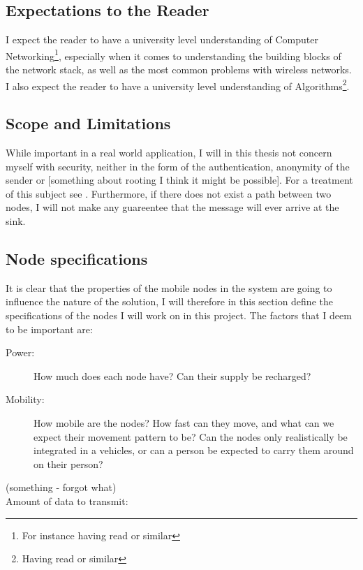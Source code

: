 \subsection{Expectations to the Reader}
I expect the reader to have a university level understanding of Computer Networking\footnote{For instance having read \cite{ComNet} or similar}, especially when it comes to understanding the building blocks of the network stack, as well as the most common problems with wireless networks. I also expect the reader to have a university level understanding of Algorithms\footnote{Having read \cite{algo} or similar}. 

\subsection{Scope and Limitations}
While important in a real world application, I will in this thesis not concern myself with security, neither in the form of the authentication, anonymity of the sender or [something about rooting I think it might be possible]. For a treatment of this subject see \cite{trustedRouting}. Furthermore, if there does not exist a path between two nodes, I will not make any guareentee that the message will ever arrive at the sink. 


\subsection{Node specifications}
It is clear that the properties of the mobile nodes in the system are going to influence the nature of the solution, I will therefore in this section define the specifications of the nodes I will work on in this project. The factors that I deem to be important are: 
\begin{description}
\item[Power:] How much does each node have? Can their supply be recharged?
\item[Mobility:] How mobile are the nodes? How fast can they move, and what can we expect their movement pattern to be? Can the nodes only realistically be integrated in a vehicles, or can a person be expected to carry them around on their person?
\item[(something - forgot what)]
\item[Amount of data to transmit:] 
\end{description}

